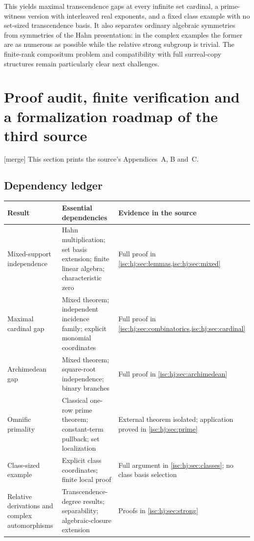 \documentclass[11pt,letterpaper]{article}
\theoremstyle{definition}
\theoremstyle{remark}
\newcommand{\mtag}{\textup{[merge]}}%
\numberwithin{equation}{section}
\begin{document}
This yields maximal transcendence gaps at every infinite set cardinal,
a prime-witness version with interleaved real exponents, and a fixed
class example with no set-sized transcendence basis. It also separates
ordinary algebraic symmetries from symmetries of the Hahn presentation:
in the complex examples the former are as numerous as possible while
the relative strong subgroup is trivial. The finite-rank compositum
problem and compatibility with full surreal-copy structures remain
particularly clear next challenges.

\section{Proof audit, finite verification and a formalization roadmap of the third source}
\label{isc:hj:sec:verify}

\mtag{} This section prints the source's Appendices~A, B and~C.

\subsection{Dependency ledger}\label{isc:hj:sub:audit}

\begin{center}
\small
\begin{tabular}{>{\raggedright\arraybackslash}p{}>{\raggedright\arraybackslash}p{}>{\raggedright\arraybackslash}p{}}
\toprule
Result & Essential dependencies & Evidence in the source\\
\midrule
Mixed-support independence & Hahn multiplication; set basis extension;
finite linear algebra; characteristic zero & Full proof in
\cref{isc:hj:sec:lemmas,isc:hj:sec:mixed}\\[4pt]
Maximal cardinal gap & Mixed theorem; independent incidence family;
explicit monomial coordinates & Full proof in
\cref{isc:hj:sec:combinatorics,isc:hj:sec:cardinal}\\[4pt]
Archimedean gap & Mixed theorem; square-root independence; binary branches &
Full proof in \cref{isc:hj:sec:archimedean}\\[4pt]
Omnific primality & Classical one-row prime theorem; constant-term pullback;
set localization & External theorem isolated; application proved in
\cref{isc:hj:sec:prime}\\[4pt]
Class-sized example & Explicit class coordinates; finite local proof &
Full argument in \cref{isc:hj:sec:classes}; no class basis selection\\[4pt]
Relative derivations and complex automorphisms & Transcendence-degree
results; separability; algebraic-closure extension & Proofs in
\cref{isc:hj:sec:strong}\\
\bottomrule
\end{tabular}
\end{center}
\end{document}
